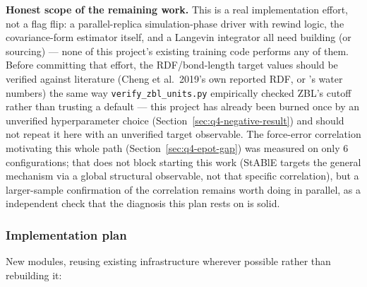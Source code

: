 \documentclass[11pt]{article}
\begin{document}
\textbf{Honest scope of the remaining work.} This is a real implementation
effort, not a flag flip: a parallel-replica simulation-phase driver with
rewind logic, the covariance-form estimator itself, and a Langevin
integrator all need building (or sourcing) --- none of this project's
existing training code performs any of them. Before committing that effort,
the RDF/bond-length target values should be verified against literature
(Cheng et al.\ 2019's own reported RDF, or \citet{thaler2021difftre}'s
water numbers) the same way \texttt{verify\_zbl\_units.py} empirically
checked ZBL's cutoff rather than trusting a default --- this project has
already been burned once by an unverified hyperparameter choice
(Section~\ref{sec:q4-negative-result}) and should not repeat it here with
an unverified target observable. The force-error correlation motivating
this whole path (Section~\ref{sec:q4-epot-gap}) was measured on only 6
configurations; that does not block starting this work (StABlE targets the
general mechanism via a global structural observable, not that specific
correlation), but a larger-sample confirmation of the correlation remains
worth doing in parallel, as a independent check that the diagnosis this
plan rests on is solid.

\subsubsection{Implementation plan}
\label{sec:q4-stable-plan}

New modules, reusing existing infrastructure wherever possible rather than
rebuilding it:
\end{document}
